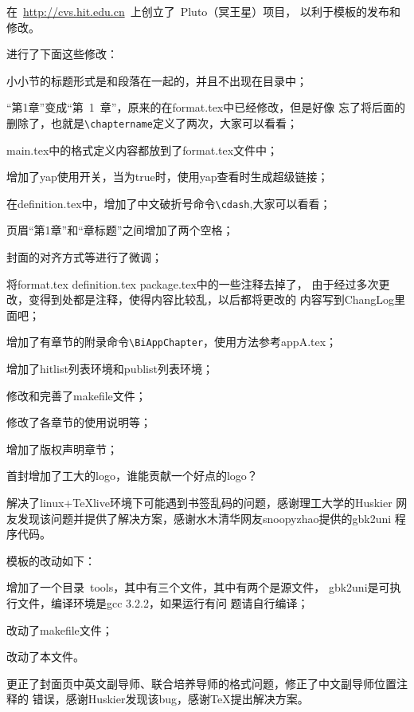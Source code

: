 在~\url{http://cvs.hit.edu.cn}~上创立了~Pluto（冥王星）项目， 以利于模板的发布和修改。

进行了下面这些修改：
\begin{hitlist}
\item 小小节的标题形式是和段落在一起的，并且不出现在目录中；
\item ``第1章''变成``第~1~章''，原来的在format.tex中已经修改，但是好像
   忘了将后面的删除了，也就是\verb"\chaptername"定义了两次，大家可以看看；
\item main.tex中的格式定义内容都放到了format.tex文件中；
\item 增加了yap使用开关，当为true时，使用yap查看时生成超级链接；
\item 在definition.tex中，增加了中文破折号命令\verb"\cdash",大家可以看看；
\item 页眉``第1章''和``章标题''之间增加了两个空格；
\item 封面的对齐方式等进行了微调；
\item 将format.tex definition.tex package.tex中的一些注释去掉了，
   由于经过多次更改，变得到处都是注释，使得内容比较乱，以后都将更改的
   内容写到ChangLog里面吧；
\item 增加了有章节的附录命令\verb"\BiAppChapter"，使用方法参考appA.tex；
\item 增加了hitlist列表环境和publist列表环境；
\item 修改和完善了makefile文件；
\item 修改了各章节的使用说明等；
\item 增加了版权声明章节；
\item 首封增加了工大的logo，谁能贡献一个好点的logo？
\end{hitlist}
解决了linux+TeXlive环境下可能遇到书签乱码的问题，感谢理工大学的Huskier
网友发现该问题并提供了解决方案，感谢水木清华网友snoopyzhao提供的gbk2uni
程序代码。

模板的改动如下：
\begin{hitlist}
\item 增加了一个目录~tools，其中有三个文件，其中有两个是源文件，
gbk2uni是可执行文件，编译环境是gcc 3.2.2，如果运行有问
题请自行编译；
\item 改动了makefile文件；
\item 改动了本文件。
\end{hitlist}
更正了封面页中英文副导师、联合培养导师的格式问题，修正了中文副导师位置注释的
错误，感谢Huskier发现该bug，感谢TeX提出解决方案。

